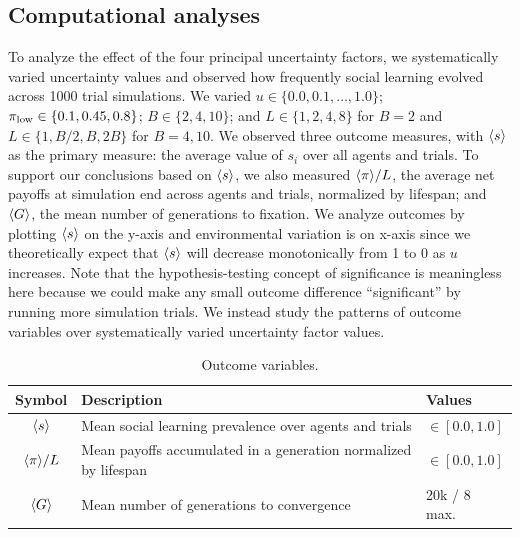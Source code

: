 \documentclass[letterpaper,11.5pt]{scrartcl}
\begin{document}
\subsection{Computational analyses}
\label{ssec:computationalAnalyses}


To analyze the effect of the four principal uncertainty factors, we systematically
varied uncertainty values and observed how frequently social learning evolved across
1000 trial simulations. We varied $u \in
\{0.0, 0.1, \ldots, 1.0\}$; $\pi_{\mathrm{low}} \in \{0.1, 0.45, 0.8\}$; $B \in \{2, 4, 10\}$;
and $L \in \{1,2,4,8\}$ for $B=2$ and $L \in \{1,B/2,B,2B\}$ for $B=4,10$.  We
observed three outcome measures, with $\langle s \rangle$ as the primary measure: 
the average value of $s_i$ over all agents and trials. To support our conclusions
based on $\langle s \rangle$, we also measured $\langle \pi \rangle / L$, the average net 
payoffs at simulation end across agents and trials, normalized by lifespan; 
and $\langle G \rangle$, the mean
number of generations to fixation. We analyze outcomes by
plotting $\langle s \rangle$ on the y-axis and environmental variation is on x-axis since we
theoretically expect that $\langle s \rangle$ will decrease monotonically from 1 to 0 as $u$
increases. Note that the hypothesis-testing concept of significance is meaningless
here because we could make any small outcome difference ``significant'' by running
more simulation trials.  We instead study the patterns of outcome variables over
systematically varied uncertainty factor values. 

\begin{table}[h]
    \caption{Outcome variables.}
    \label{tab:outcomeVariables}
    \centering %
    \begin{tabular}{cp{4.25in}p{0.85in}} \toprule

        Symbol & Description & Values \\ 

        \midrule  

        $\langle s \rangle$ & Mean social learning prevalence over agents and trials
                  & $\in [0.0, 1.0]$ \\

        $\langle \pi \rangle / L$ & Mean payoffs accumulated in a generation normalized by
        lifespan & $\in [0.0, 1.0]$ \\

        $\langle G \rangle$ & Mean number of generations to convergence & 20k / 8 max. \\
        \bottomrule
    \end{tabular}
\end{table}
\end{document}
